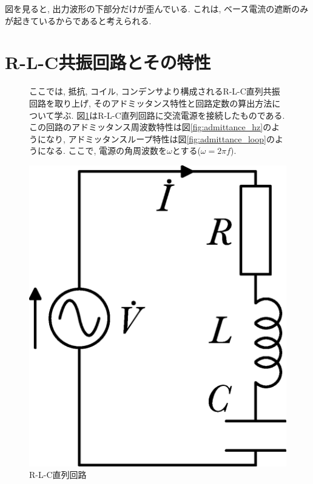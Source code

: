 \documentclass[titlepage]{jsarticle}
\begin{document}
                図を見ると, 出力波形の下部分だけが歪んでいる.
                これは, ベース電流の遮断のみが起きているからであると考えられる.

\section{R-L-C共振回路とその特性}
    \begin{figure}[H]
        \begin{minipage}{0.6\hsize}
            ここでは, 抵抗, コイル, コンデンサより構成されるR-L-C直列共振回路を取り上げ,
            そのアドミッタンス特性と回路定数の算出方法について学ぶ.
            図\ref{fig:rlc}はR-L-C直列回路に交流電源を接続したものである.
            この回路のアドミッタンス周波数特性は図\ref{fig:admittance_hz}のようになり,
            アドミッタンスループ特性は図\ref{fig:admittance_loop}のようになる.
            ここで, 電源の角周波数を$\omega$とする($\omega = 2 \pi f$).
        \end{minipage}
        \begin{minipage}{0.4\hsize}
            \centering
            \includegraphics[width=0.6\hsize]{images/rlc.eps}
            \caption{R-L-C直列回路}
            \label{fig:rlc}
        \end{minipage}
    \end{figure}
\end{document}
